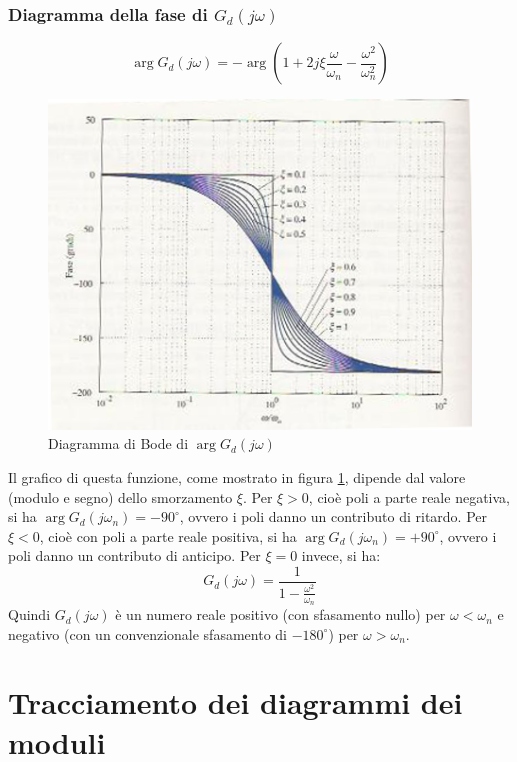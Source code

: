 \documentclass[a4paper]{report}
\begin{document}
\subsubsection{Diagramma della fase di $G_d(j\omega)$}
\begin{displaymath}
  \arg G_d(j\omega)=-\arg \left ( 1 + 2j\xi \dfrac{\omega}{\omega_n} -
  \dfrac{\omega^2}{\omega_n^2} \right)
\end{displaymath}
\begin{figure}[!hbp]
  \begin{center}
    \includegraphics[scale=0.5]{./figures/diagfas4.png}
    \caption{Diagramma di Bode di $\arg G_d(j\omega)$}\label{fig:fasi4}
  \end{center}
\end{figure} 

Il grafico di questa funzione, come mostrato in figura
\ref{fig:fasi4}, dipende dal valore (modulo e segno) dello smorzamento
$\xi$. Per $\xi > 0$, cio\`e poli a parte reale negativa, si ha $\arg
G_d(j\omega_n) = -90^{\circ}$, ovvero i poli danno un contributo di
ritardo. Per $\xi < 0$, cio\`e con poli a parte reale positiva, si ha
$\arg G_d(j\omega_n)= + 90^{\circ}$, ovvero i poli danno un contributo
di anticipo. Per $\xi = 0$ invece, si ha:
\begin{displaymath}
  G_d(j\omega)=\dfrac{1}{1-\frac{\omega^2}{\omega_n}}
\end{displaymath}
Quindi $G_d(j\omega)$ \`e un numero reale positivo (con sfasamento
nullo) per $\omega < \omega_n$ e negativo (con un convenzionale
sfasamento di $-180^{\circ}$) per $\omega > \omega_n$.

\section{Tracciamento dei diagrammi dei moduli}
\end{document}

